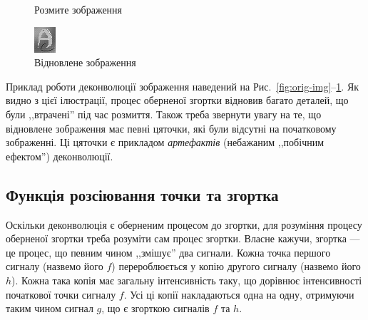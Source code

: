 \documentclass[simple,14pt,utf8,ukrainian]{eskdtext}
\begin{document}
\begin{figure}[!htb]
          \caption{Розмите зображення}\label{fig:conv-img}
        \endminipage\hfill
          \includegraphics[width=\linewidth]{ADecon.jpg}
          \caption{Відновлене зображення}\label{fig:deconv-img}
        \endminipage\hfill
    \end{figure}

    Приклад роботи деконволюції зображення наведений на
    Рис.~\ref{fig:orig-img}--\ref{fig:deconv-img}.
    Як видно з цієї ілюстрації, процес оберненої згортки відновив багато
    деталей, що були ,,втрачені'' під час розмиття.
    Також треба звернути увагу на те, що відновлене зображення має певні
    цяточки, які були відсутні на початковому зображенні.
    Ці цяточки є прикладом \emph{артефактів} (небажаним ,,побічним ефектом'')
    деконволюції.\cite{deconvolve-index}
    \clearpage

  \subsection{Функція розсіювання точки та згортка}
    Оскільки деконволюція є оберненим процесом до згортки, для розуміння
    процесу оберненої згортки треба розуміти сам процес згортки.
    Власне кажучи, згортка --- це процес, що певним чином ,,змішує'' два
    сигнали.
    Кожна точка першого сигналу (назвемо його $f$) перероблюється у копію
    другого сигналу (назвемо його $h$).
    Кожна така копія має загальну інтенсивність таку, що дорівнює
    інтенсивності початкової точки сигналу $f$.
    Усі ці копії накладаються одна на одну, отримуючи таким чином сигнал $g$,
    що є згорткою сигналів $f$ та $h$.
\end{document}
